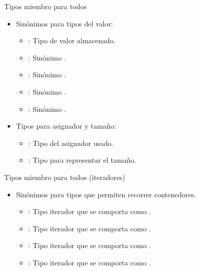 \begin{frame}[t]{Tipos miembro para todos}
\begin{itemize}
  \item Sinónimos para tipos del valor:
  \begin{itemize}
    \item {}: Tipo de valor almacenado.
    \item {}: Sinónimo .
    \item {}: Sinónimo .
    \item {}: Sinónimo .
    \item {}: Sinónimo .
  \end{itemize}
  \item Tipos para asignador y tamaño:
  \begin{itemize}
    \item {}: Tipo del asignador usado.
    \item {}: Tipo para representar el tamaño.
  \end{itemize}
\end{itemize}
\end{frame}

\begin{frame}[t]{Tipos miembro para todos (iteradores)}
\begin{itemize}
  \item Sinónimos para tipos que permiten recorrer contenedores.
  \begin{itemize}
    \item {}: Tipo iterador que se comporta como .
    \item {}: Tipo iterador que se comporta como .
    \item {}: Tipo iterador que se comporta como .
    \item {}: Tipo iterador que se comporta como .
  \end{itemize}
\end{itemize}
\end{frame}


